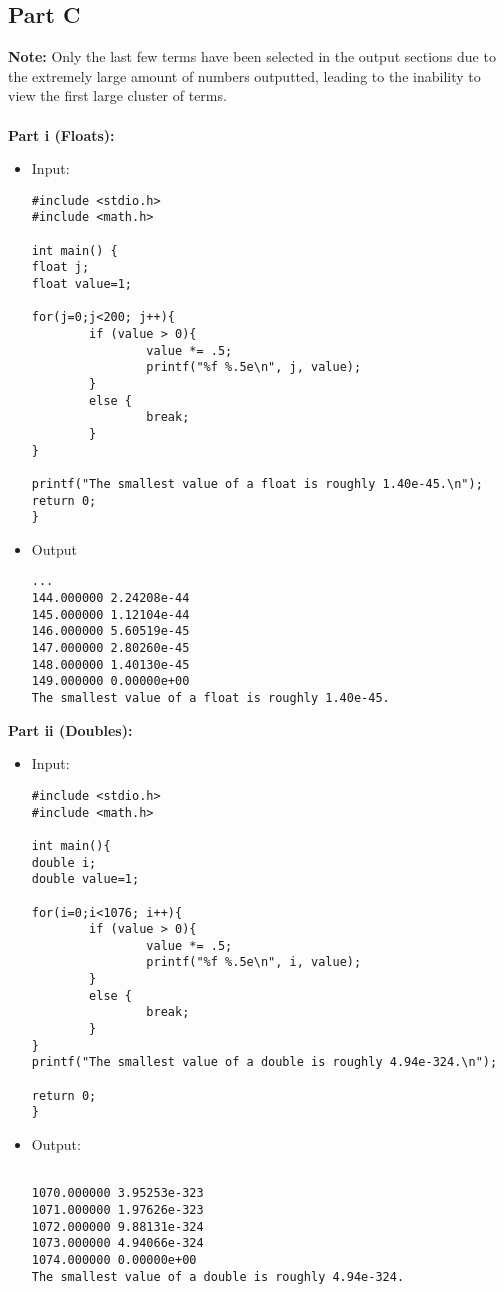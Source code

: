 \documentclass[10pt]{article}
\begin{document}
\subsection{Part C}
\textbf{Note:} Only the last few terms have been selected in the output sections due to the extremely large amount of numbers outputted, leading to the inability to view the first large cluster of terms.\\ \\
\textbf{Part i (Floats):}
\begin{itemize}
 \item Input:
\begin{verbatim}
#include <stdio.h>
#include <math.h>

int main() {
float j;
float value=1;

for(j=0;j<200; j++){
        if (value > 0){
                value *= .5;
                printf("%f %.5e\n", j, value);
        }
        else {
                break;
        }
}

printf("The smallest value of a float is roughly 1.40e-45.\n");
return 0;
}
\end{verbatim}
\item Output
\begin{verbatim}
...
144.000000 2.24208e-44
145.000000 1.12104e-44
146.000000 5.60519e-45
147.000000 2.80260e-45
148.000000 1.40130e-45
149.000000 0.00000e+00
The smallest value of a float is roughly 1.40e-45.
\end{verbatim}
\end{itemize}
\textbf{Part ii (Doubles):}
\begin{itemize}
\item Input:
\begin{verbatim}
#include <stdio.h>
#include <math.h>

int main(){
double i;
double value=1;

for(i=0;i<1076; i++){
        if (value > 0){
                value *= .5;
                printf("%f %.5e\n", i, value);
        }
        else {
                break;
        }
}
printf("The smallest value of a double is roughly 4.94e-324.\n");

return 0;
}
\end{verbatim}
\item Output:
\begin{verbatim}

1070.000000 3.95253e-323
1071.000000 1.97626e-323
1072.000000 9.88131e-324
1073.000000 4.94066e-324
1074.000000 0.00000e+00
The smallest value of a double is roughly 4.94e-324.
\end{verbatim}
\end{itemize}
\end{document}

